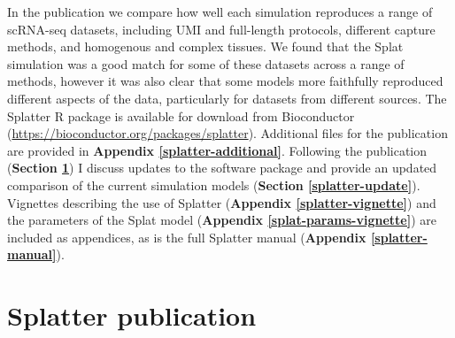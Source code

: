 \documentclass[11pt,a4paper,titlepage,twoside,openright]{style/unimelbthesis}
\theoremstyle{definition}
\theoremstyle{definition}
\theoremstyle{definition}
\theoremstyle{remark}
\begin{document}
\begin{mainmatter}
In the publication we compare how well each simulation reproduces a range of scRNA-seq datasets, including UMI and full-length protocols, different capture methods, and homogenous and complex tissues. We found that the Splat simulation was a good match for some of these datasets across a range of methods, however it was also clear that some models more faithfully reproduced different aspects of the data, particularly for datasets from different sources. The Splatter R package is available for download from Bioconductor (\url{https://bioconductor.org/packages/splatter}). Additional files for the publication are provided in \textbf{Appendix \ref{splatter-additional}}. Following the publication (\textbf{Section \ref{splatter-publication}}) I discuss updates to the software package and provide an updated comparison of the current simulation models (\textbf{Section \ref{splatter-update}}). Vignettes describing the use of Splatter (\textbf{Appendix \ref{splatter-vignette}}) and the parameters of the Splat model (\textbf{Appendix \ref{splat-params-vignette}}) are included as appendices, as is the full Splatter manual (\textbf{Appendix \ref{splatter-manual}}).

\hypertarget{splatter-publication}{%
\section{Splatter publication}\label{splatter-publication}}

\clearpage
{}\clearpage
{}\clearpage
{}\clearpage
{}\clearpage
{}\clearpage
{}\clearpage
{}\clearpage
{}\clearpage
{}\clearpage
{}\clearpage
{}\clearpage
{}\clearpage
{}\clearpage
{}\clearpage


\end{mainmatter}
\end{document}
